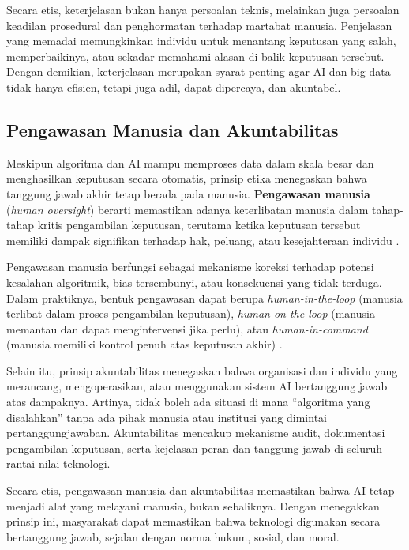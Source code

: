 Secara etis, keterjelasan bukan hanya persoalan teknis, melainkan juga persoalan keadilan prosedural dan penghormatan terhadap martabat manusia. Penjelasan yang memadai memungkinkan individu untuk menantang keputusan yang salah, memperbaikinya, atau sekadar memahami alasan di balik keputusan tersebut. Dengan demikian, keterjelasan merupakan syarat penting agar AI dan big data tidak hanya efisien, tetapi juga adil, dapat dipercaya, dan akuntabel.

\subsection{Pengawasan Manusia dan Akuntabilitas}

Meskipun algoritma dan AI mampu memproses data dalam skala besar dan menghasilkan keputusan secara otomatis, prinsip etika menegaskan bahwa tanggung jawab akhir tetap berada pada manusia. \textbf{Pengawasan manusia} (\textit{human oversight}) berarti memastikan adanya keterlibatan manusia dalam tahap-tahap kritis pengambilan keputusan, terutama ketika keputusan tersebut memiliki dampak signifikan terhadap hak, peluang, atau kesejahteraan individu \cite{jobin2019global}.  

Pengawasan manusia berfungsi sebagai mekanisme koreksi terhadap potensi kesalahan algoritmik, bias tersembunyi, atau konsekuensi yang tidak terduga. Dalam praktiknya, bentuk pengawasan dapat berupa \textit{human-in-the-loop} (manusia terlibat dalam proses pengambilan keputusan), \textit{human-on-the-loop} (manusia memantau dan dapat mengintervensi jika perlu), atau \textit{human-in-command} (manusia memiliki kontrol penuh atas keputusan akhir) \cite{cath2018governing}.  

Selain itu, prinsip akuntabilitas menegaskan bahwa organisasi dan individu yang merancang, mengoperasikan, atau menggunakan sistem AI bertanggung jawab atas dampaknya. Artinya, tidak boleh ada situasi di mana “algoritma yang disalahkan” tanpa ada pihak manusia atau institusi yang dimintai pertanggungjawaban. Akuntabilitas mencakup mekanisme audit, dokumentasi pengambilan keputusan, serta kejelasan peran dan tanggung jawab di seluruh rantai nilai teknologi.  

Secara etis, pengawasan manusia dan akuntabilitas memastikan bahwa AI tetap menjadi alat yang melayani manusia, bukan sebaliknya. Dengan menegakkan prinsip ini, masyarakat dapat memastikan bahwa teknologi digunakan secara bertanggung jawab, sejalan dengan norma hukum, sosial, dan moral.

